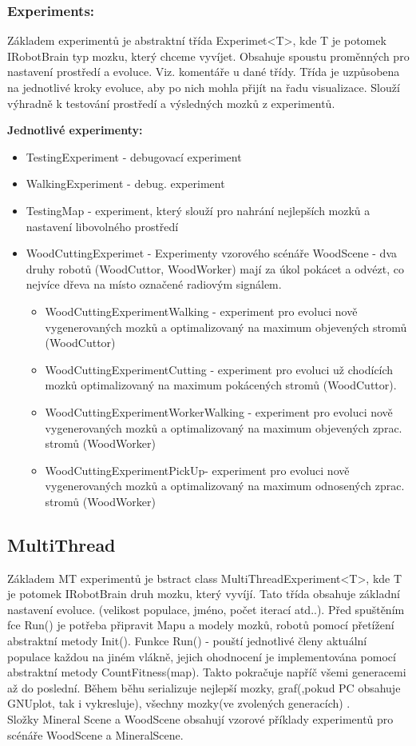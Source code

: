 \documentclass[12pt, oneside]{article}
\begin{document}
\subsubsection{Experiments:}
Základem experimentů je abstraktní třída Experimet<T>, kde T je potomek IRobotBrain typ mozku, který chceme vyvíjet. Obsahuje spoustu proměnných pro nastavení prostředí a evoluce. Viz. komentáře u dané třídy. Třída je uzpůsobena na jednotlivé kroky evoluce, aby po nich mohla přijít na řadu visualizace. Slouží výhradně k testování prostředí a výsledných mozků z experimentů. \par
\textbf{Jednotlivé experimenty:} \par
\begin{itemize}
\item TestingExperiment - debugovací experiment
\item WalkingExperiment - debug. experiment
\item TestingMap - experiment, který slouží pro nahrání nejlepších mozků a nastavení libovolného prostředí
\item WoodCuttingExperimet - Experimenty vzorového scénáře WoodScene - dva druhy robotů (WoodCuttor, WoodWorker) mají za úkol pokácet a odvézt, co nejvíce dřeva na místo označené radiovým signálem.
\begin{itemize}
\item WoodCuttingExperimentWalking - experiment pro evoluci nově vygenerovaných mozků a optimalizovaný na maximum objevených stromů (WoodCuttor)
\item WoodCuttingExperimentCutting  - experiment pro  evoluci už chodících mozků optimalizovaný na maximum pokácených stromů (WoodCuttor). 
\item WoodCuttingExperimentWorkerWalking - experiment pro evoluci nově vygenerovaných mozků a optimalizovaný na maximum objevených zprac. stromů  (WoodWorker)
\item WoodCuttingExperimentPickUp- experiment pro evoluci nově vygenerovaných mozků a optimalizovaný na maximum  odnosených zprac. stromů (WoodWorker)
\end{itemize}
\end{itemize}
\subsection{MultiThread}
Základem MT experimentů je bstract class MultiThreadExperiment<T>, kde T je potomek IRobotBrain druh mozku, který vyvíjí. Tato třída obsahuje základní nastavení evoluce. (velikost populace, jméno, počet iterací atd..). Před spuštěním fce Run() je potřeba připravit Mapu a modely mozků, robotů pomocí přetížení abstraktní metody Init(). Funkce Run() - pouští jednotlivé členy aktuální populace každou na jiném vlákně, jejich ohodnocení je implementována pomocí abstraktní metody CountFitness(map). Takto pokračuje napříč všemi generacemi až do poslední. Během běhu serializuje nejlepší mozky, graf(,pokud PC obsahuje GNUplot, tak i vykresluje), všechny mozky(ve zvolených generacích) . \\
Složky Mineral Scene a WoodScene obsahují vzorové příklady experimentů pro scénáře WoodScene a MineralScene.
\end{document}
